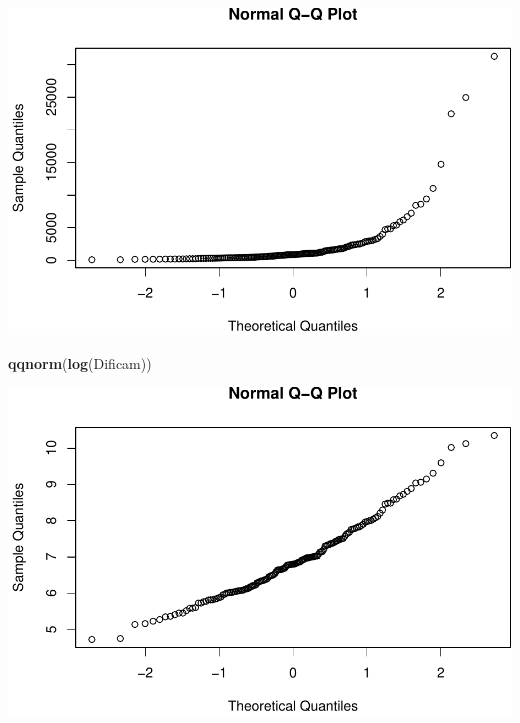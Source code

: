 \documentclass[11pt,]{article}
\newenvironment{Shaded}{\begin{snugshade}}{\end{snugshade}}
\newcommand{\KeywordTok}[1]{\textcolor[rgb]{0.13,0.29,0.53}{\textbf{#1}}}
\newcommand{\StringTok}[1]{\textcolor[rgb]{0.31,0.60,0.02}{#1}}
\newcommand{\OperatorTok}[1]{\textcolor[rgb]{0.81,0.36,0.00}{\textbf{#1}}}
\newcommand{\NormalTok}[1]{#1}
\begin{document}
\includegraphics[width=1\linewidth]{img/unnamed-chunk-3-3}

\begin{Shaded}
\begin{Highlighting}[]
\KeywordTok{qqnorm}\NormalTok{(}\KeywordTok{log}\NormalTok{(Dificam))}
\end{Highlighting}
\end{Shaded}

\includegraphics[width=1\linewidth]{img/unnamed-chunk-3-4}

\begin{Shaded}
\end{Shaded}
\end{document}
